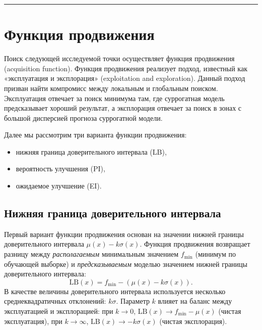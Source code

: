 \documentclass[11pt,a4paper]{article}
\providecommand{\tightlist}{%
      \setlength{\itemsep}{0pt}\setlength{\parskip}{0pt}}
\begin{document}
    \begin{center}\rule{0.5\linewidth}{0.5pt}\end{center}

    \hypertarget{ux444ux443ux43dux43aux446ux438ux44f-ux43fux440ux43eux434ux432ux438ux436ux435ux43dux438ux44f}{%
\section{Функция
продвижения}\label{ux444ux443ux43dux43aux446ux438ux44f-ux43fux440ux43eux434ux432ux438ux436ux435ux43dux438ux44f}}

    Поиск следующей исследуемой точки осуществляет функция продвижения
(acquisition function). Функция продвижения реализует подход, известный
как «эксплуатация и эксплорация» (exploitation and exploration). Данный
подход призван найти компромисс между локальным и глобальным поиском.
Эксплуатация отвечает за поиск минимума там, где суррогатная модель
предсказывает хороший результат, а эксплорация отвечает за поиск в зонах
с большой дисперсией прогноза суррогатной модели.

    Далее мы рассмотрим три варианта функции продвижения:

\begin{itemize}
\tightlist
\item
  нижняя граница доверительного интервала (LB),
\item
  вероятность улучшения (PI),
\item
  ожидаемое улучшение (EI).
\end{itemize}

    \hypertarget{ux43dux438ux436ux43dux44fux44f-ux433ux440ux430ux43dux438ux446ux430-ux434ux43eux432ux435ux440ux438ux442ux435ux43bux44cux43dux43eux433ux43e-ux438ux43dux442ux435ux440ux432ux430ux43bux430}{%
\subsection{Нижняя граница доверительного
интервала}\label{ux43dux438ux436ux43dux44fux44f-ux433ux440ux430ux43dux438ux446ux430-ux434ux43eux432ux435ux440ux438ux442ux435ux43bux44cux43dux43eux433ux43e-ux438ux43dux442ux435ux440ux432ux430ux43bux430}}

Первый вариант функции продвижения основан на значении нижней границы
доверительного интервала \(\mu(x) - k \sigma(x)\). Функция продвижения
возвращает разницу между \emph{располагаемым} минимальным значением
\(f_\mathrm{min}\) (минимум по обучающей выборке) и
\emph{предсказываемым} моделью значением нижней границы доверительного
интервала:
\[
  \mathrm{LB}(x) = f_\mathrm{min} - \left(\mu(x) - k \sigma(x) \right).
\]
В качестве величины доверительного интервала используется несколько
среднеквадратичных отклонений: \(k\sigma\). Параметр \(k\) влияет на
баланс между эксплуатацией и эксплорацией: при \(k \rightarrow 0\),
\(\mathrm{LB}(x) \rightarrow f_\mathrm{min} - \mu(x)\) (чистая
эксплуатация), при \(k \rightarrow \infty\),
\(\mathrm{LB}(x) \rightarrow -k \sigma(x)\) (чистая эксплорация).
\end{document}
